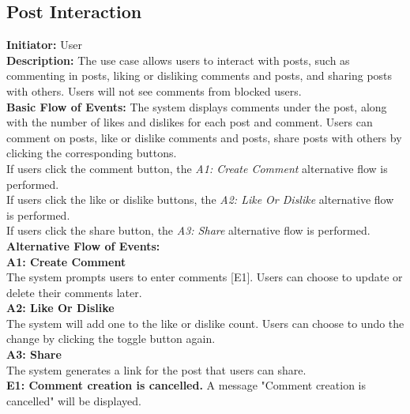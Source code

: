 \documentclass[a4paper,11pt]{scrreprt}
\begin{document}
\begin{figure}[H]
    \centering
    
\end{figure}

\subsection{Post Interaction}
\textbf{\large Initiator: }User\\
\textbf{\large Description: }The use case allows users to interact with posts, such as commenting in posts, liking or disliking comments and posts, and sharing posts with others. Users will not see comments from blocked users.\\
\textbf{\large Basic Flow of Events: }The system displays comments under the post, along with the number of likes and dislikes for each post and comment. Users can comment on posts, like or dislike comments and posts, share posts with others by clicking the corresponding buttons.\\
If users click the comment button, the \textit{A1: Create Comment} alternative flow is performed.\\
If users click the like or dislike buttons, the \textit{A2: Like Or Dislike} alternative flow is performed.\\
If users click the share button, the \textit{A3: Share} alternative flow is performed.\\
\textbf{\large Alternative Flow of Events: }\\
\textbf{A1: Create Comment}\\
The system prompts users to enter comments [E1]. Users can choose to update or delete their comments later.\\
\textbf{A2: Like Or Dislike}\\
The system will add one to the like or dislike count. Users can choose to undo the change by clicking the toggle button again.\\
\textbf{A3: Share}\\
The system generates a link for the post that users can share.\\
\textbf{E1: Comment creation is cancelled.} A message "Comment creation is cancelled" will be displayed.\\

\begin{figure}[H]
    \centering
    
\end{figure}
\end{document}
